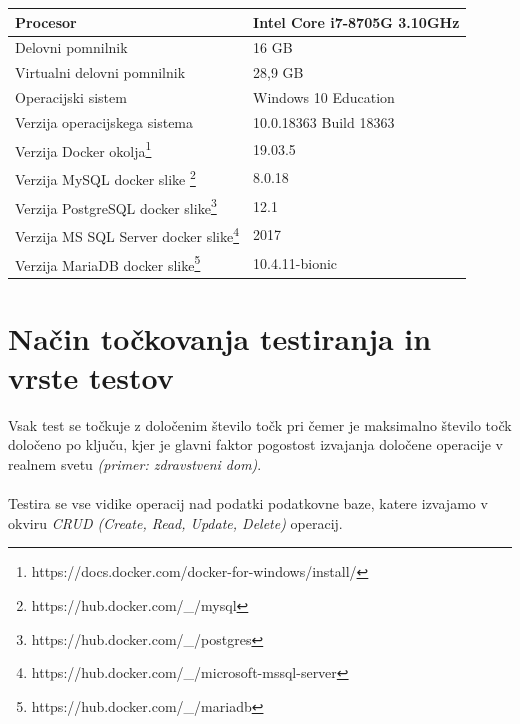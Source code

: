 \documentclass[a4paper,11pt]{report}
\begin{document}
\begin{center}
    \begin{tabular}{||l|l||}
        \hline
        Procesor & Intel Core i7-8705G 3.10GHz\\
        \hline
        Delovni pomnilnik & 16 GB\\
        \hline
        Virtualni delovni pomnilnik & 28,9 GB\\
        \hline
        Operacijski sistem & Windows 10 Education\\
        \hline
        Verzija operacijskega sistema & 10.0.18363 Build 18363\\
        \hline
        Verzija Docker okolja\footnote{https://docs.docker.com/docker-for-windows/install/} & 19.03.5\\
        \hline
        Verzija MySQL docker slike \footnote{https://hub.docker.com/\_/mysql} & 8.0.18 \\
        \hline
        Verzija PostgreSQL docker slike\footnote{https://hub.docker.com/\_/postgres} & 12.1\\
        \hline
        Verzija MS SQL Server docker slike\footnote{https://hub.docker.com/\_/microsoft-mssql-server} & 2017\\
        \hline
        Verzija MariaDB docker slike\footnote{https://hub.docker.com/\_/mariadb} & 10.4.11-bionic\\
        \hline
    \end{tabular}
\end{center}
\paragraph{}

\section{Način točkovanja testiranja in vrste testov}

Vsak test se točkuje z določenim število točk pri čemer je maksimalno število točk določeno po ključu, kjer je glavni faktor pogostost izvajanja določene operacije v realnem svetu \textit{(primer: zdravstveni dom)}.
\\\\
Testira se vse vidike operacij nad podatki podatkovne baze, katere izvajamo v okviru \textit{CRUD (Create, Read, Update, Delete)} operacij.
\end{document}
